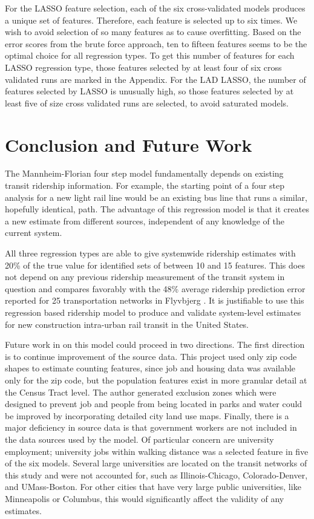 \documentclass[11pt]{article}
\begin{document}
For the LASSO feature selection, each of the six cross-validated models produces a unique set of features. Therefore, each feature is selected up to six times. We wish to avoid selection of so many features as to cause overfitting. Based on the error scores from the brute force approach, ten to fifteen features seems to be the optimal choice for all regression types. To get this number of features for each LASSO regression type, those features selected by at least four of six cross validated runs are marked in the Appendix. For the LAD LASSO, the number of features selected by LASSO is unusually high, so those features selected by at least five of size cross validated runs are selected, to avoid saturated models. 

\section{Conclusion and Future Work}

The Mannheim-Florian four step model fundamentally depends on existing transit ridership information. For example, the starting point of a four step analysis for a new light rail line would be an existing bus line that runs a similar, hopefully identical, path. The advantage of this regression model is that it creates a new estimate from different sources, independent of any knowledge of the current system.

All three regression types are able to give systemwide ridership estimates with 20\% of the true value for identified sets of between 10 and 15 features. This does not depend on any previous ridership measurement of the transit system in question and compares favorably with the 48\% average ridership prediction  error reported for 25 transportation networks in Flyvbjerg \cite{Flyvbjerg2006}. It is justifiable to use this regression based ridership model to produce and validate system-level estimates for new construction intra-urban rail transit in the United States. 

Future work in on this model could proceed in two directions. The first direction is to continue improvement of the source data. This project used only zip code shapes to estimate counting features, since job and housing data was available only for the zip code, but the population features exist in more granular detail at the Census Tract level. The author generated exclusion zones which were designed to prevent job and people from being located in parks and water could be improved by incorporating detailed city land use maps. Finally, there is a major deficiency in source data is that government workers are not included in the data sources used by the model. Of particular concern are university employment; university jobs within walking distance was a selected feature in five of the six models. Several large universities are located on the transit networks of this study and were not accounted for, such as Illinois-Chicago, Colorado-Denver, and UMass-Boston. For other cities that have very large public universities, like Minneapolis or Columbus, this would significantly affect the validity of any estimates.
\end{document}
